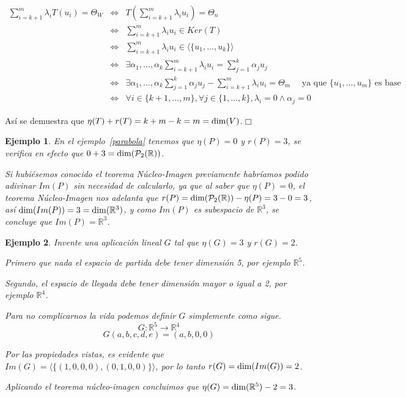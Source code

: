 \documentclass[12pt]{book}
\newtheorem{ejem}{Ejemplo}
\def\pq{\vspace{0.5cm}}
\def\R{\mathbb{R}}
\def\P{\mathcal{P}}
\def\dim{\textup{dim}}
\begin{document}
\begin{itemize}
    \begin{eqnarray*}
      \sum_{i=k+1}^m\lambda_iT(u_i)=\Theta_W
      &\Leftrightarrow& T\left(\sum_{i=k+1}^m\lambda_iu_i\right)=\Theta_n\\
      &\Leftrightarrow& \sum_{i=k+1}^m\lambda_iu_i\in Ker(T)\\
      &\Leftrightarrow& \sum_{i=k+1}^m\lambda_iu_i\in \langle\{u_1,\dots,u_k\}\rangle\\
      &\Leftrightarrow& \exists \alpha_1,\dots,\alpha_k \sum_{i=k+1}^m\lambda_iu_i=\sum_{j=1}^k \alpha_ju_j\\
      &\Leftrightarrow& \exists \alpha_1,\dots,\alpha_k \sum_{j=1}^k \alpha_ju_j-\sum_{i=k+1}^m\lambda_iu_i=\Theta_m\quad\text{ ya que }\{u_1,\dots,u_m\}\text{ es base}\\
      &\Leftrightarrow& \forall i\in\{k+1,\dots,m\},\forall j\in\{1,\dots,k\},\lambda_i=0\wedge\alpha_j=0
    \end{eqnarray*}
  \end{itemize}

Así se demuestra que $\eta(T)+r(T)=k+m-k=m=\dim(V)$.\hfill $\Box$

\pq

\begin{ejem}{\em 
En el ejemplo~\ref{parabola} tenemos que $\eta(P)=0$ y $r(P)=3$, se verifica en efecto que $0+3=\dim(\P_2(\R))$.

Si hubiésemos conocido el teorema Núcleo-Imagen previamente habríamos podido adivinar $Im(P)$ sin necesidad de calcularlo, ya que al saber que $\eta(P)=0$, el teorema Núcleo-Imagen nos adelanta que $r(P)=\dim(\P_2(\R))-\eta(P)=3-0=3$, así $\dim(Im(P))=3=\dim(\R^3)$, y como $Im(P)$ es subespacio de $\R^3$, se concluye que $Im(P)=\R^3$.
}
\end{ejem}

\begin{ejem}
  Invente una aplicación lineal $G$ tal que $\eta(G)=3$ y $r(G)=2$.

  Primero que nada el espacio de partida debe tener dimensión 5, por ejemplo $\R^5$.

  Segundo, el espacio de llegada debe tener dimensión mayor o igual a 2, por ejemplo $\R^4$.

  Para no complicarnos la vida podemos definir $G$ simplemente como sigue.
  $$G:\R^5\rightarrow \R^4 $$
  $$G(a,b,c,d,e)=(a,b,0,0)$$

  Por las propiedades vistas, es evidente que $Im(G)=\langle\{(1,0,0,0),(0,1,0,0)\}\rangle$, por lo tanto $r(G)=\dim(Im(G))=2$.

  Aplicando el teorema núcleo-imagen concluimos que $\eta(G)=\dim(\R^5)-2=3$.
\end{ejem}
\end{document}
